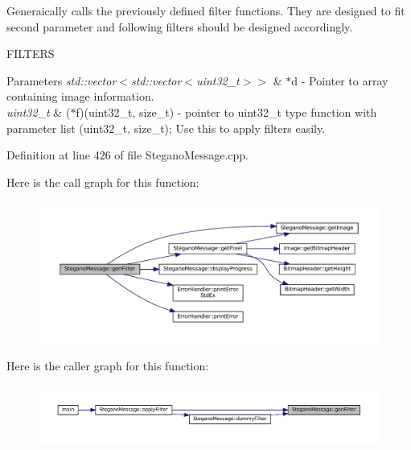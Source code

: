 Generaically calls the previously defined filter functions. They are designed to fit second parameter and following filters should be designed accordingly. 

F\+I\+L\+T\+E\+RS
\begin{DoxyParams}{Parameters}
{\em std\+::vector$<$std\+::vector$<$uint32\+\_\+t$>$$>$} & $\ast$d -\/ Pointer to array containing image information. \\
\hline
{\em uint32\+\_\+t} & ($\ast$f)(uint32\+\_\+t, size\+\_\+t) -\/ pointer to uint32\+\_\+t type function with parameter list (uint32\+\_\+t, size\+\_\+t); Use this to apply filters easily. \\
\hline
\end{DoxyParams}


Definition at line 426 of file Stegano\+Message.\+cpp.

Here is the call graph for this function\+:\nopagebreak
\begin{figure}[H]
\begin{center}
\leavevmode
\includegraphics[width=350pt]{classSteganoMessage_a1cb326688e9a054127396d198bd6f976_cgraph}
\end{center}
\end{figure}
Here is the caller graph for this function\+:\nopagebreak
\begin{figure}[H]
\begin{center}
\leavevmode
\includegraphics[width=350pt]{classSteganoMessage_a1cb326688e9a054127396d198bd6f976_icgraph}
\end{center}
\end{figure}
\mbox{\label{classSteganoMessage_a0134757a8c79caa9dca9bcce0686d1ef}} 
